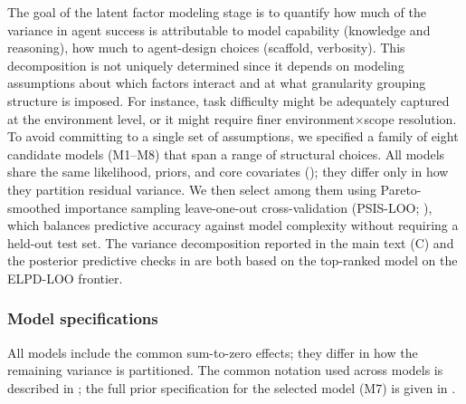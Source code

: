 The goal of the latent factor modeling stage is to quantify how much of the variance in agent success is attributable to model capability (knowledge and reasoning), how much to agent-design choices (scaffold, verbosity). This decomposition is not uniquely determined since it depends on modeling assumptions about which factors interact and at what granularity grouping structure is imposed. For instance, task difficulty might be adequately captured at the environment level, or it might require finer environment×scope resolution. To avoid committing to a single set of assumptions, we specified a family of eight candidate models (M1–M8) that span a range of structural choices. All models share the same likelihood, priors, and core covariates (); they differ only in how they partition residual variance. We then select among them using Pareto-smoothed importance sampling leave-one-out cross-validation \autocite{vehtari2017practical} (PSIS-LOO; ), which balances predictive accuracy against model complexity without requiring a held-out test set. The variance decomposition reported in the main text (C) and the posterior predictive checks in  are both based on the top-ranked model on the ELPD-LOO frontier.


\subsubsection{Model specifications}
\label{sec:models_irt}

All models include the common sum-to-zero effects; they differ in how the
remaining variance is partitioned. The common notation used across models is described in ; the full prior specification
  for the selected model (M7) is given in .

